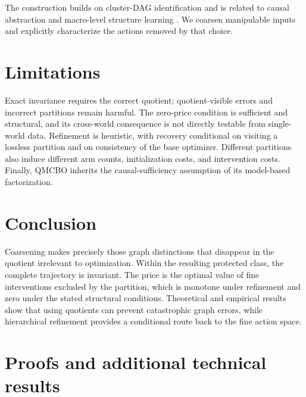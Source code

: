 \documentclass[twoside]{article}
\begin{document}
The construction builds on cluster-DAG identification \citep{CausalEffectIdentification} and is related to causal abstraction and macro-level structure learning \citep{beckersAbstractingCausalModels2019,madaleno2026a}. We coarsen manipulable inputs and explicitly characterize the actions removed by that choice.

\section{Limitations}
\label{sec:limitations}

Exact invariance requires the correct quotient; quotient-visible errors and incorrect partitions remain harmful. The zero-price condition is sufficient and structural, and its cross-world consequence is not directly testable from single-world data. Refinement is heuristic, with recovery conditional on visiting a lossless partition and on consistency of the base optimizer. Different partitions also induce different arm counts, initialization costs, and intervention costs. Finally, QMCBO inherits the causal-sufficiency
assumption of its model-based factorization.

\section{Conclusion}
\label{sec:conclusion}

Coarsening makes precisely those graph distinctions that disappear in the quotient irrelevant to optimization. Within the resulting protected class, the complete trajectory is invariant. The price is the optimal value of fine interventions excluded by the partition, which is monotone under refinement and zero under the stated structural conditions. Theoretical and empirical results show that using quotients can prevent catastrophic graph errors, while hierarchical refinement provides a conditional route back to the fine action space.




\appendix
\onecolumn
\raggedbottom

\section{Proofs and additional technical results}
\label{app:proofs}
\end{document}

